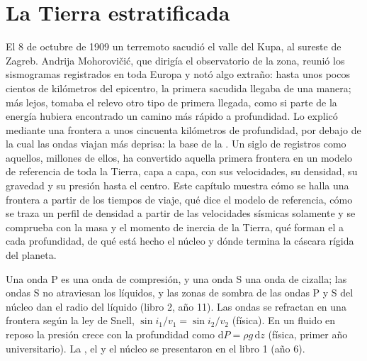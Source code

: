 \chapter{La Tierra estratificada}\label{ch:b1:layered-earth}

El 8 de octubre de 1909 un terremoto sacudió el valle del Kupa, al sureste de Zagreb.
Andrija Mohorovičić, que dirigía el observatorio de la zona, reunió los sismogramas registrados en toda Europa
y notó algo extraño: hasta unos pocos cientos de kilómetros del epicentro, la primera sacudida llegaba de una
manera; más lejos, tomaba el relevo otro tipo de primera llegada, como si parte de la energía hubiera encontrado
un camino más rápido a profundidad. Lo explicó mediante una frontera a unos cincuenta kilómetros de profundidad,
por debajo de la cual las ondas viajan más deprisa: la base de la . Un siglo de registros como aquellos,
millones de ellos, ha convertido aquella primera frontera en un modelo de referencia de toda la Tierra, capa a
capa, con sus velocidades, su densidad, su gravedad y su presión hasta el centro. Este capítulo muestra cómo se
halla una frontera a partir de los tiempos de viaje, qué dice el modelo de referencia, cómo se traza un perfil de
densidad a partir de las velocidades sísmicas solamente y se comprueba con la masa y el momento de inercia de la
Tierra, qué  forman el  a cada profundidad, de qué está hecho el núcleo y dónde termina la cáscara
rígida del planeta.

\begin{recall}
Una onda P es una onda de compresión, y una onda S una onda de cizalla; las ondas S no atraviesan los líquidos, y las
zonas de sombra de las ondas P y S del núcleo dan el radio del  líquido (libro 2, año 11). Las ondas se
refractan en una frontera según la ley de Snell, $\sin i_1/v_1 = \sin i_2/v_2$ (física). En un fluido en reposo la
presión crece con la profundidad como $\mathrm dP = \rho g\,\mathrm dz$ (física, primer año universitario). La ,
el  y el núcleo se presentaron en el libro 1 (año 6).
\end{recall}

